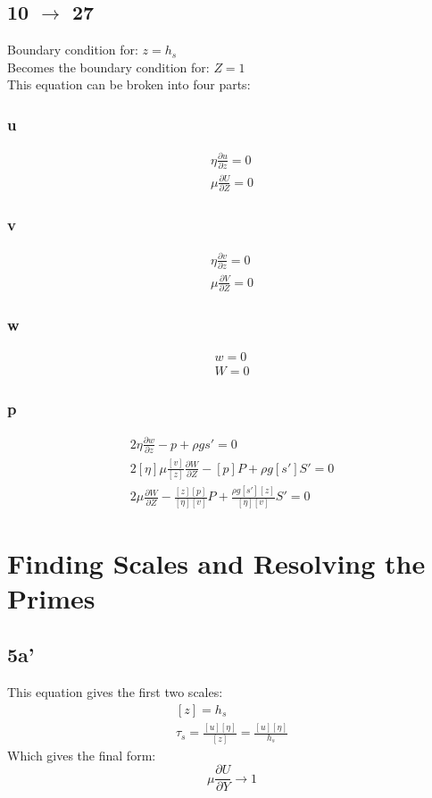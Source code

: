 \documentclass[10pt, letterpaper, twoside]{article}
\newcommand{\pd}[2]{\frac{\partial#1}{\partial#2}}
\begin{document}
	\subsection{10 $ \rightarrow $ 27}
	Boundary condition for: $ z = h_s $\\
	Becomes the boundary condition for: $ Z = 1 $\\
	This equation can be broken into four parts:
	\subsubsection{u}
	\begin{gather*}
		\eta\pd{u}{z} = 0 \tag{10a} \\
		\mu\pd{U}{Z} = 0 \tag{27a}
	\end{gather*}
	\subsubsection{v}
	\begin{gather*}
		\eta\pd{v}{z} = 0 \tag{10b} \\
		\mu\pd{V}{Z} = 0 \tag{27b}
	\end{gather*}
	\subsubsection{w}
	\begin{gather*}
		w = 0 \tag{10c} \\
		W = 0 \tag{27c}
	\end{gather*}
	\subsubsection{p}
	\begin{gather*}
		2\eta\pd{w}{z} - p + \rho g s' = 0 \tag{10d} \\
		2\left[\eta\right]\mu\frac{\left[v\right]}{\left[z\right]}\pd{W}{Z} - \left[p\right]P + \rho g\left[s'\right]S' = 0\\
		2\mu\pd{W}{Z} - \frac{\left[z\right]\left[p\right]}{\left[\eta\right]\left[v\right]}P + \frac{\rho g \left[s'\right]\left[z\right]}{\left[\eta\right]\left[v\right]}S' = 0 \tag{10d'}
	\end{gather*}
	
	\section{Finding Scales and Resolving the Primes}
	\subsection{5a'}
	This equation gives the first two scales:
	\begin{gather*}
		\left[z\right] = h_s\\
		\tau_s = \frac{\left[u\right]\left[\eta\right]}{\left[z\right]} = \frac{\left[u\right]\left[\eta\right]}{h_s}
	\end{gather*}
	Which gives the final form:
	\begin{equation*}
		\mu\pd{U}{Y}\rightarrow 1 \tag{25a}
	\end{equation*}
	
\end{document}
